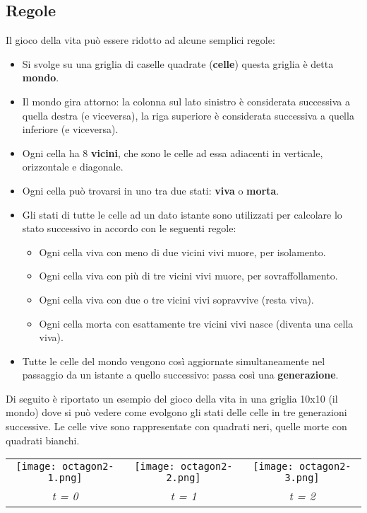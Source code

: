 \subsection{Regole}
\label{sec:rules}
Il gioco della vita pu\`o essere ridotto ad alcune semplici regole:
\begin{itemize}
  \item Si svolge su una griglia di caselle quadrate (\textbf{celle}) questa griglia \`e detta \textbf{mondo}.
  \item Il mondo gira attorno: la colonna sul lato sinistro \`e considerata successiva a quella destra (e viceversa), la riga superiore \`e considerata successiva a quella inferiore (e viceversa).
  \item Ogni cella ha 8 \textbf{vicini}, che sono le celle ad essa adiacenti in verticale, orizzontale e diagonale.
  \item Ogni cella pu\`o trovarsi in uno tra due stati: \textbf{viva} o \textbf{morta}.
  \item Gli stati di tutte le celle ad un dato istante sono utilizzati per calcolare lo stato successivo in accordo con le seguenti regole:
  \begin{itemize}
    \item Ogni cella viva con meno di due vicini vivi muore, per isolamento.
    \item Ogni cella viva con pi\`u di tre vicini vivi muore, per sovraffollamento.
    \item Ogni cella viva con due o tre vicini vivi sopravvive (resta viva).
    \item Ogni cella morta con esattamente tre vicini vivi nasce (diventa una cella viva).
  \end{itemize}
  \item Tutte le celle del mondo vengono cos\`i aggiornate simultaneamente nel passaggio da un istante a quello successivo: passa cos\`i una \textbf{generazione}.
\end{itemize}
Di seguito \`e riportato un esempio del gioco della vita in una griglia 10x10 (il mondo) dove si pu\`o vedere come evolgono gli stati delle celle in tre generazioni successive. Le celle vive sono rappresentate con quadrati neri, quelle morte con quadrati bianchi.
\begin{center}
\begin{tabular}{ccc}
  \texttt{[image: octagon2-1.png]} &
  \texttt{[image: octagon2-2.png]} &
  \texttt{[image: octagon2-3.png]} \\
  \emph{t = 0} &
  \emph{t = 1} &
  \emph{t = 2} \\
\end{tabular}
\end{center}


